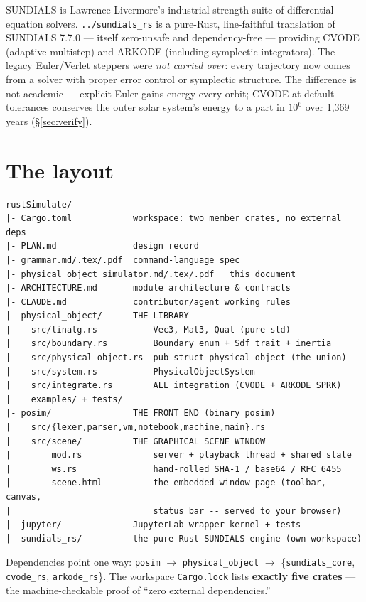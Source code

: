 \documentclass[11pt]{article}
\newcommand{\code}[1]{\texttt{#1}}
\begin{document}
SUNDIALS is Lawrence Livermore's industrial-strength suite of
differential-equation solvers. \code{../sundials\_rs} is a pure-Rust,
line-faithful translation of SUNDIALS 7.7.0 --- itself zero-unsafe and
dependency-free --- providing CVODE (adaptive multistep) and ARKODE
(including symplectic integrators). The legacy Euler/Verlet steppers
were \emph{not carried over}: every trajectory now comes from a solver
with proper error control or symplectic structure. The difference is not
academic --- explicit Euler gains energy every orbit; CVODE at default
tolerances conserves the outer solar system's energy to a part in
$10^{6}$ over 1{,}369 years (\S\ref{sec:verify}).

\section{The layout}

\begin{lstlisting}
rustSimulate/
|- Cargo.toml            workspace: two member crates, no external deps
|- PLAN.md               design record
|- grammar.md/.tex/.pdf  command-language spec
|- physical_object_simulator.md/.tex/.pdf   this document
|- ARCHITECTURE.md       module architecture & contracts
|- CLAUDE.md             contributor/agent working rules
|- physical_object/      THE LIBRARY
|    src/linalg.rs           Vec3, Mat3, Quat (pure std)
|    src/boundary.rs         Boundary enum + Sdf trait + inertia
|    src/physical_object.rs  pub struct physical_object (the union)
|    src/system.rs           PhysicalObjectSystem
|    src/integrate.rs        ALL integration (CVODE + ARKODE SPRK)
|    examples/ + tests/
|- posim/                THE FRONT END (binary posim)
|    src/{lexer,parser,vm,notebook,machine,main}.rs
|    src/scene/          THE GRAPHICAL SCENE WINDOW
|        mod.rs              server + playback thread + shared state
|        ws.rs               hand-rolled SHA-1 / base64 / RFC 6455
|        scene.html          the embedded window page (toolbar, canvas,
|                            status bar -- served to your browser)
|- jupyter/              JupyterLab wrapper kernel + tests
|- sundials_rs/          the pure-Rust SUNDIALS engine (own workspace)
\end{lstlisting}

Dependencies point one way:
\code{posim} $\to$ \code{physical\_object} $\to$
\{\code{sundials\_core}, \code{cvode\_rs}, \code{arkode\_rs}\}. The
workspace \code{Cargo.lock} lists \textbf{exactly five crates} --- the
machine-checkable proof of ``zero external dependencies.''
\end{document}
